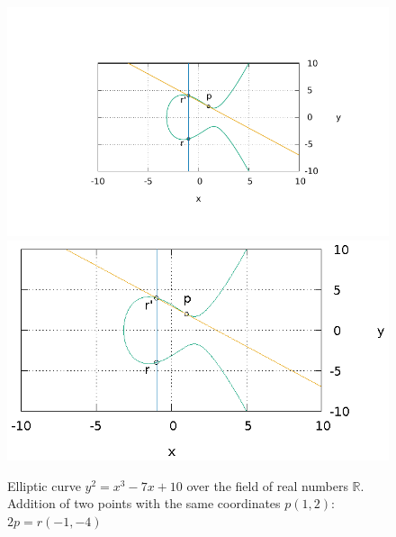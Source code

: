 \begin{figure}
\centering
\ifpdf
\includegraphics[angle=0,scale=1.5]
{./elliptic/picellipticsumeq2.pdf}
\else
\includegraphics[angle=0,scale=1.5]
{./elliptic/picellipticsumeq2.eps}
\fi
\caption{Elliptic curve $y^2 = x^3 -7 x + 10$ over the field of real numbers $\mathbb{R}$. Addition of two points with the same coordinates $p(1,2)$: $2p = r (-1,-4)$}
\label{fig:add:ellipticRsumEq2}
\end{figure}
